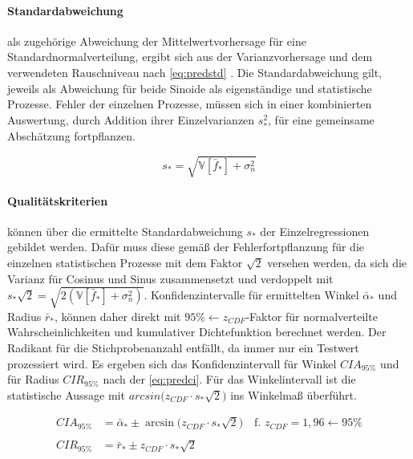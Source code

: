 \paragraph*{Standardabweichung} als zugehörige Abweichung der Mittelwertvorhersage für eine Standardnormalverteilung, ergibt sich aus der Varianzvorhersage und dem verwendeten Rauschniveau nach \autoref{eq:predstd} \cite{Rasmussen2006}. Die Standardabweichung gilt, jeweils als Abweichung für beide Sinoide als eigenständige und statistische Prozesse. Fehler der einzelnen Prozesse, müssen sich in einer kombinierten Auswertung, durch Addition ihrer Einzelvarianzen $s_*^2$, für eine gemeinsame Abschätzung fortpflanzen.


\begin{equation}\label{eq:predstd}
s_* = \sqrt{\mathbb{V}\left[ \bar{f}_* \right] + \sigma_n^2}
\end{equation}


\paragraph*{Qualitätskriterien} können über die ermittelte Standardabweichung $s_*$ der Einzelregressionen gebildet werden. Dafür muss diese gemäß der Fehlerfortpflanzung für die einzelnen statistischen Prozesse mit dem Faktor $\sqrt{2}$ versehen werden, da sich die Varianz für Cosinus und Sinus zusammensetzt und verdoppelt mit $s_* \sqrt{2} = \sqrt{2(\mathbb{V}\left[ \bar{f}_* \right] + \sigma_n^2)}$. Konfidenzintervalle für ermittelten Winkel $\bar{\alpha}_*$ und Radius $\bar{r}_*$, können daher direkt mit $95\% \leftarrow z_{CDF}$-Faktor für normalverteilte Wahrscheinlichkeiten und kumulativer Dichtefunktion berechnet werden. Der Radikant für die Stichprobenanzahl entfällt, da immer nur ein Testwert prozessiert wird. Es ergeben sich das Konfidenzintervall für Winkel $CIA_{95\%}$ und für Radius $CIR_{95\%}$ nach der \autoref{eq:predci}. Für das Winkelintervall ist die statistische Aussage mit $arcsin \big( z_{CDF} \cdot s_* \sqrt{2} \big)$ ins Winkelmaß überführt.


\begin{align}\label{eq:predci}
	CIA_{95\%} &= \bar{\alpha}_* \pm \arcsin \big( z_{CDF} \cdot s_* \sqrt{2} \big) \quad \text{f. } z_{CDF} = 1,96 \leftarrow 95\% \nonumber \\
	\\
	CIR_{95\%} &= \bar{r}_* \pm z_{CDF} \cdot s_* \sqrt{2} \nonumber
\end{align}





